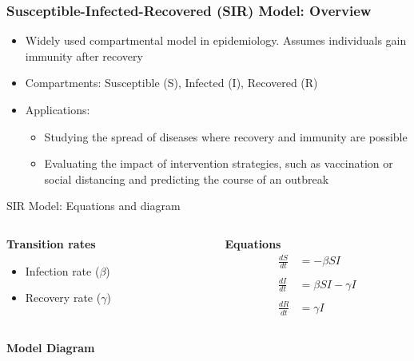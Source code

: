 \begin{frame}
  \frametitle{Susceptible-Infected-Recovered (SIR) Model: Overview}
  \begin{itemize}
    \item Widely used compartmental model in epidemiology. Assumes individuals gain immunity after recovery
    \item Compartments: Susceptible (S), Infected (I), Recovered (R)

    \item Applications:
      \begin{itemize}
        \item Studying the spread of diseases where recovery and immunity are possible
        \item Evaluating the impact of intervention strategies, such as vaccination or social distancing and predicting the course of an outbreak
      \end{itemize}
  \end{itemize}
\end{frame}

\begin{frame}{SIR Model: Equations and diagram}
\begin{columns}[t]
    \begin{column}{0.5\textwidth}
    \textbf{Transition rates}
     \begin{itemize}
        \item Infection rate ($\beta$)
        \item Recovery rate ($\gamma$)
      \end{itemize}
        
    \end{column}
    \begin{column}{0.5\textwidth}
    \textbf{Equations}
  \begin{align*}
    \frac{dS}{dt} &= -\beta S I \\
    \\
    \frac{dI}{dt} &= \beta S I - \gamma I \\
    \\
    \frac{dR}{dt} &= \gamma I
  \end{align*}
        
    \end{column}
\end{columns}

\vfill
\textbf{Model Diagram}
\begin{center}
  \end{center}
\end{frame}

